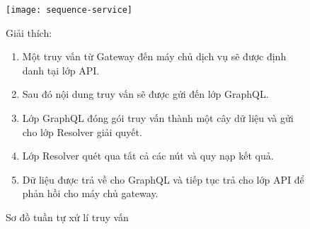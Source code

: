 \clearpage
\FloatBarrier
\begin{figure}[!htbp]\fontsize{13px}{13px}\selectfont
	\begin{center}	
	\texttt{[image: sequence-service]}
	\caption{Sơ đồ tuần tự xử lí truy vấn}
		\end{center}
	Giải thích:
	\begin{enumerate}[before=\fontsize{13px}{13px}\selectfont]
		\item Một truy vấn từ Gateway đến máy chủ dịch vụ sẽ được định danh tại lớp API.
		\item Sau đó nội dung truy vấn sẽ được gửi đến lớp GraphQL.
		\item Lớp GraphQL đóng gói truy vấn thành một cây dữ liệu và gửi cho lớp Resolver giải quyết.
		\item Lớp Resolver quét qua tất cả các nút và quy nạp kết quả.
		\item Dữ liệu được trả về cho GraphQL và tiếp tục trả cho lớp API để phản hồi cho máy chủ gateway.
	\end{enumerate}
\end{figure}

